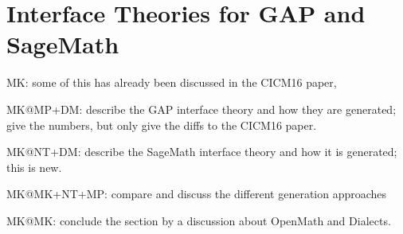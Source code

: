 \section{Interface Theories for GAP and SageMath}\label{sec:ift}
\begin{todolist}{MK: some of this has already been discussed in the CICM16 paper, }
\item MK@MP+DM: describe the GAP interface theory and how they are generated; give the
numbers, but only give the diffs to the CICM16 paper.
\item MK@NT+DM: describe the SageMath interface theory and how it is generated; this is
  new. 
\item MK@MK+NT+MP: compare and discuss the different generation approaches
\item MK@MK: conclude the section by a discussion about OpenMath and Dialects.
\end{todolist}

